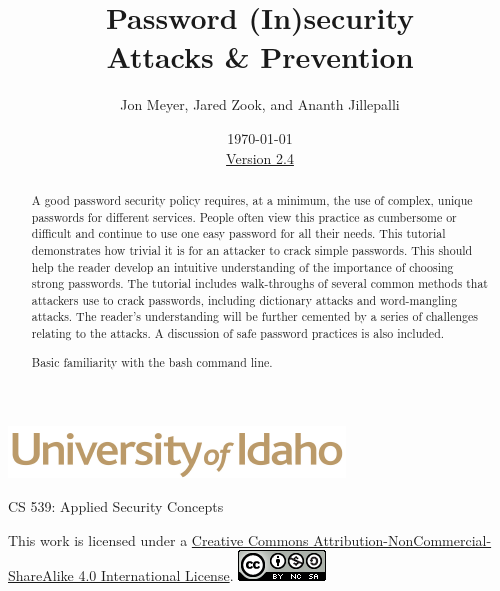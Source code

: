 \documentclass[12pt]{extarticle}
\begin{document}
	\title{ Password (In)security \\ \large Attacks \& Prevention}
	\author{Jon Meyer, Jared Zook, and Ananth Jillepalli}
	\date{\today \\ \hyperref[changelog]{Version 2.4} }
	\renewcommand{\abstractname}{Summary}
	\begin{titlepage}
		\maketitle
		\begin{center}
			\includegraphics[scale=.5]{UofI}
			
			\large{CS 539: Applied Security Concepts}
			
			\vskip 40pt
			
		\end{center}
		
		\begin{abstract}
			A good password security policy requires, at a minimum, the use of complex, unique passwords for different services. People often view this practice as cumbersome or difficult and continue to use one easy password for all their needs. This tutorial demonstrates how trivial it is for an attacker to crack simple passwords. This should help the reader develop an intuitive understanding of the importance of choosing strong passwords. The tutorial includes walk-throughs of several common methods that attackers use to crack passwords, including dictionary attacks and word-mangling attacks. The reader's understanding will be further cemented by a series of challenges relating to the attacks. A discussion of safe password practices is also included.
			
			
			Basic familiarity with the bash command line.
		\end{abstract}
		
		
		\vfill
		\begin{center}
			This work is licensed under a \href{https://creativecommons.org/licenses/by-nc-sa/4.0/legalcode}{Creative Commons Attribution-NonCommercial-ShareAlike 4.0 International License}.
			\vskip 10pt
			\includegraphics[scale=.5]{cc}
		\end{center}
		
	\end{titlepage}
	
\end{document}
